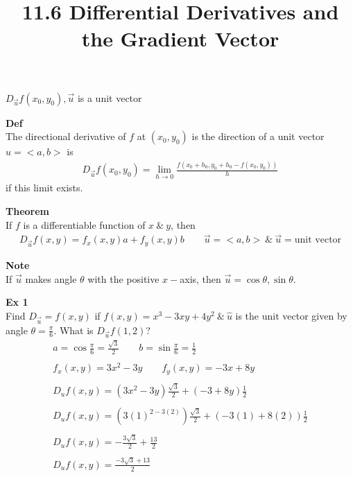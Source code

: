 \documentclass{article}
\title{11.6 Differential Derivatives and the Gradient Vector}
\begin{document}
    \maketitle
    $ D_{\vec{u}} f(x_{0},y_{0}  ), \vec{u}$ is a unit vector

    \textbf{Def}\\
    The directional derivative of $ f $ at $ (x_{0},y_{0} ) $ is the direction of a unit vector $ \hat{u}=< a, b > $ is
    \[
        \begin{gathered}
          D_{\vec{u}} f(x_{0},y_{0} ) = \lim_{h \to 0} \frac{f(x_{0}+h_{0},y_{0}+h_{0}-f(x_{0},y_{0}))}{h}  
        \end{gathered}
    \]
    if this limit exists.

    \textbf{Theorem}\\
    If $ f $ is a differentiable function of $ x ~\&~ y $, then
    \[
        \begin{gathered}
        D_{\vec{u}}f(x,y) = f_{x}(x,y)a +f_{y}(x,y)b \qquad \vec{u}=< a, b > ~\&~ \vec{u}= \text{unit vector}    
        \end{gathered}
    \]
   
    \textbf{Note}\\
    If $ \vec{u} $ makes angle $ \theta $ with the positive $ x- $axis, then $ \vec{u}=\cos{\theta},\sin{\theta} $.

    \textbf{Ex 1}\\
    Find $ D_{\vec{u}}=f(x,y)$ if $ f(x,y) =x^{3}-3xy+4y^{2} ~\&~ \hat{u}$ is the unit vector given by angle $ \theta=\frac{\pi}{6} $. What is $ D_{\vec{u}}f(1,2)$?
    \[
        \begin{gathered}
        a=\cos{\frac{\pi}{6} }=\frac{\sqrt{3}}{2} \qquad b=\sin{\frac{\pi}{6} }=\frac{1}{2} \\
        ~\\
        f_{x}(x,y)=3x^{2}-3y \qquad f_{y}(x,y)=-3x+8y\\
        ~\\
        \boxed{D_{u}f(x,y)=(3x^{2}-3y )\frac{\sqrt{3}}{2}+(-3+8y)\frac{1}{2}}\\
        ~\\
        D_{u}f(x,y)=(3(1)^{2-3(2)})\frac{\sqrt{3} }{2}+(-3(1)+8(2))\frac{1}{2}\\
        ~\\
        D_{u}f(x,y)=-\frac{3\sqrt{3}}{2} +\frac{13}{2}\\
        ~\\
        \boxed{D_{u}f(x,y)=\frac{-3\sqrt{3}+13}{2}}  
        \end{gathered}
    \]
    
\end{document}
